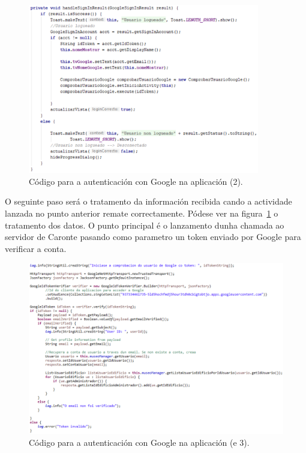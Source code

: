 \begin{figure}[htb] 
	\begin{center}
		\includegraphics[width=0.9\textwidth]{figures/codigo/autenticacionGoogleRecepcion}
		\caption{Código para a autenticación con Google na aplicación (2).}
		\label{fig:autenticacionGoogleRecepcion}
	\end{center}
\end{figure}

O seguinte paso será o tratamento da información recibida cando a actividade lanzada no punto anterior remate correctamente. Pódese ver na figura~\ref{fig:autenticacionGoogleRecepcion} o tratamento dos datos. O punto principal é o lanzamento dunha chamada ao servidor de Caronte pasando como parametro un token enviado por Google para verificar a conta.

\begin{figure}[htb] 
	\begin{center}
		\includegraphics[width=1\textwidth]{figures/codigo/autenticacionGoogleServidor}
		\caption{Código para a autenticación con Google na aplicación (e 3).}
		\label{fig:autenticacionGoogleServidor}
	\end{center}
\end{figure}

